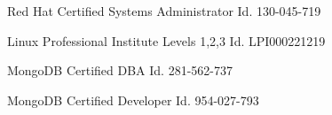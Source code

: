 \begin{cvskills}
  \cvskill
    {Red Hat Certified Systems Administrator} %
    {Id. 130-045-719} %

  \cvskill
    {Linux Professional Institute Levels 1,2,3} %
    {Id. LPI000221219} %

  \cvskill
    {MongoDB Certified DBA} %
    {Id. 281-562-737} %

  \cvskill
    {MongoDB Certified Developer} %
    {Id. 954-027-793} %

\end{cvskills}
